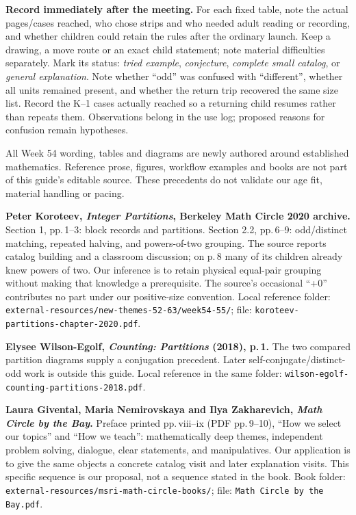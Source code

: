 \documentclass[letterpaper,11pt]{article}
\newcommand{\heading}[1]{\vspace{4pt}{\large\bfseries #1}\par}
\begin{document}
\textbf{Record immediately after the meeting.} For each fixed table, note the actual pages/cases reached, who chose strips and who needed adult reading or recording, and whether children could retain the rules after the ordinary launch. Keep a drawing, a move route or an exact child statement; note material difficulties separately. Mark its status: \emph{tried example}, \emph{conjecture}, \emph{complete small catalog}, or \emph{general explanation}. Note whether ``odd'' was confused with ``different'', whether all units remained present, and whether the return trip recovered the same size list. Record the K--1 cases actually reached so a returning child resumes rather than repeats them. Observations belong in the use log; proposed reasons for confusion remain hypotheses.

\heading{Mathematical and teaching precedents}
All Week 54 wording, tables and diagrams are newly authored around established mathematics. Reference prose, figures, workflow examples and books are not part of this guide's editable source. These precedents do not validate our age fit, material handling or pacing.

\textbf{Peter Koroteev, \emph{Integer Partitions}, Berkeley Math Circle 2020 archive.} Section 1, pp.\,1--3: block records and partitions. Section 2.2, pp.\,6--9: odd/distinct matching, repeated halving, and powers-of-two grouping. The source reports catalog building and a classroom discussion; on p.\,8 many of its children already knew powers of two. Our inference is to retain physical equal-pair grouping without making that knowledge a prerequisite. The source's occasional ``+0'' contributes no part under our positive-size convention. Local reference folder: \nolinkurl{external-resources/new-themes-52-63/week54-55/}; file: \nolinkurl{koroteev-partitions-chapter-2020.pdf}.

\textbf{Elysee Wilson-Egolf, \emph{Counting: Partitions} (2018), p.\,1.} The two compared partition diagrams supply a conjugation precedent. Later self-conjugate/distinct-odd work is outside this guide. Local reference in the same folder: \nolinkurl{wilson-egolf-counting-partitions-2018.pdf}.

\textbf{Laura Givental, Maria Nemirovskaya and Ilya Zakharevich, \emph{Math Circle by the Bay}.} Preface printed pp.\,viii--ix (PDF pp.\,9--10), ``How we select our topics'' and ``How we teach'': mathematically deep themes, independent problem solving, dialogue, clear statements, and manipulatives. Our application is to give the same objects a concrete catalog visit and later explanation visits. This specific sequence is our proposal, not a sequence stated in the book. Book folder: \nolinkurl{external-resources/msri-math-circle-books/}; file: \texttt{Math Circle by the Bay.pdf}.
\end{document}
